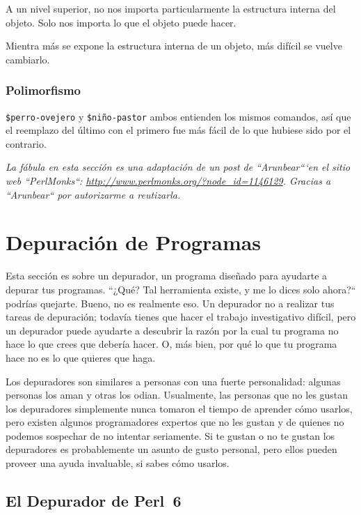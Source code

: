 A un nivel superior, no nos importa particularmente
la estructura interna del objeto. Solo nos importa
lo que el objeto puede hacer.

Mientra más se expone la estructura interna de un objeto,
más difícil se vuelve cambiarlo.

\subsubsection{Polimorfismo}
\verb|$perro-ovejero| y \verb|$niño-pastor| ambos
entienden los mismos comandos, así que el reemplazo
del último con el primero fue más fácil de lo que
hubiese sido por el contrario.

\emph{La fábula en esta sección es una adaptación de
un post de ``Arunbear```en el sitio web ``PerlMonks``:
\url{http://www.perlmonks.org/?node_id=1146129}. Gracias
a ``Arunbear`` por autorizarme a reutizarla.}


\section{Depuración de Programas}
\label{perl-debugger}

Esta sección es sobre un depurador, un programa diseñado para
ayudarte a depurar tus programas. ``¿Qué? Tal herramienta existe,
y me lo dices solo ahora?`` podrías quejarte. Bueno, no es realmente
eso. Un depurador no a realizar tus tareas de depuración; todavía 
tienes que hacer el trabajo investigativo difícil, pero un depurador
puede ayudarte a descubrir la razón por la cual tu programa
no hace lo que crees que debería hacer. O, más bien, por qué lo
que tu programa hace no es lo que quieres que haga.

Los depuradores son similares a personas con una fuerte
personalidad: algunas personas los aman y otras los odian. Usualmente,
las personas que no les gustan los depuradores simplemente
nunca tomaron el tiempo de aprender cómo usarlos, pero existen 
algunos programadores expertos que no les gustan y de quienes 
no podemos sospechar de no intentar seriamente. Si te gustan
o no te gustan los depuradores es probablemente un asunto de
gusto personal, pero ellos pueden proveer una ayuda invaluable, si sabes 
cómo usarlos.

\subsection{El Depurador de Perl~6}

